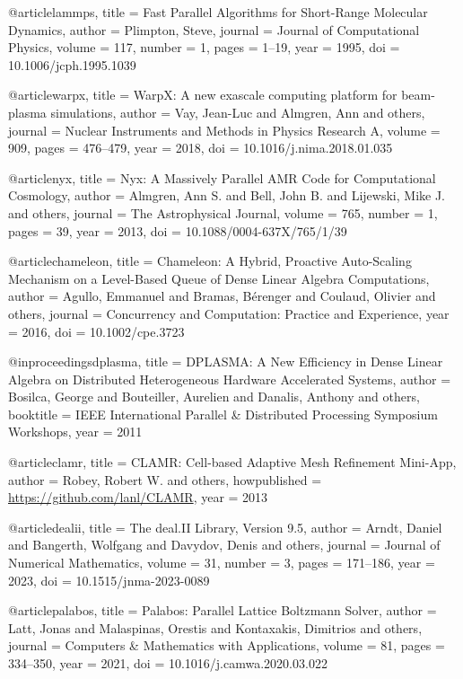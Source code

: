 @article{lammps,
  title = {Fast Parallel Algorithms for Short-Range Molecular Dynamics},
  author = {Plimpton, Steve},
  journal = {Journal of Computational Physics},
  volume = {117},
  number = {1},
  pages = {1--19},
  year = {1995},
  doi = {10.1006/jcph.1995.1039}
}

@article{warpx,
  title = {{WarpX}: A new exascale computing platform for beam-plasma simulations},
  author = {Vay, Jean-Luc and Almgren, Ann and others},
  journal = {Nuclear Instruments and Methods in Physics Research A},
  volume = {909},
  pages = {476--479},
  year = {2018},
  doi = {10.1016/j.nima.2018.01.035}
}

@article{nyx,
  title = {Nyx: A Massively Parallel {AMR} Code for Computational Cosmology},
  author = {Almgren, Ann S. and Bell, John B. and Lijewski, Mike J. and others},
  journal = {The Astrophysical Journal},
  volume = {765},
  number = {1},
  pages = {39},
  year = {2013},
  doi = {10.1088/0004-637X/765/1/39}
}

@article{chameleon,
  title = {Chameleon: A Hybrid, Proactive Auto-Scaling Mechanism on a Level-Based Queue of Dense Linear Algebra Computations},
  author = {Agullo, Emmanuel and Bramas, B{\'e}renger and Coulaud, Olivier and others},
  journal = {Concurrency and Computation: Practice and Experience},
  year = {2016},
  doi = {10.1002/cpe.3723}
}

@inproceedings{dplasma,
  title = {{DPLASMA}: A New Efficiency in Dense Linear Algebra on Distributed Heterogeneous Hardware Accelerated Systems},
  author = {Bosilca, George and Bouteiller, Aurelien and Danalis, Anthony and others},
  booktitle = {IEEE International Parallel \& Distributed Processing Symposium Workshops},
  year = {2011}
}

@article{clamr,
  title = {{CLAMR}: Cell-based Adaptive Mesh Refinement Mini-App},
  author = {Robey, Robert W. and others},
  howpublished = {\url{https://github.com/lanl/CLAMR}},
  year = {2013}
}

@article{dealii,
  title = {The deal.{II} Library, Version 9.5},
  author = {Arndt, Daniel and Bangerth, Wolfgang and Davydov, Denis and others},
  journal = {Journal of Numerical Mathematics},
  volume = {31},
  number = {3},
  pages = {171--186},
  year = {2023},
  doi = {10.1515/jnma-2023-0089}
}

@article{palabos,
  title = {Palabos: Parallel Lattice {Boltzmann} Solver},
  author = {Latt, Jonas and Malaspinas, Orestis and Kontaxakis, Dimitrios and others},
  journal = {Computers \& Mathematics with Applications},
  volume = {81},
  pages = {334--350},
  year = {2021},
  doi = {10.1016/j.camwa.2020.03.022}
}

